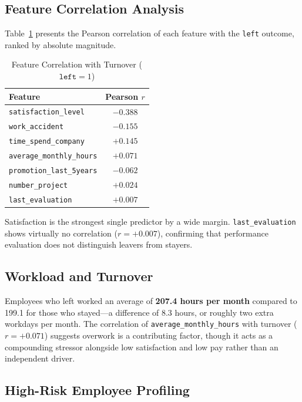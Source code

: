 \documentclass[conference]{IEEEtran}
\begin{document}
\subsection{Feature Correlation Analysis}

Table~\ref{tab:corr} presents the Pearson correlation of each feature with
the \texttt{left} outcome, ranked by absolute magnitude.

\begin{table}[h]
\caption{Feature Correlation with Turnover ($\mathtt{left} = 1$)}
\label{tab:corr}
\centering
\begin{tabular}{lc}
\toprule
\textbf{Feature} & \textbf{Pearson $r$} \\
\midrule
\texttt{satisfaction\_level}    & $-0.388$ \\
\texttt{work\_accident}         & $-0.155$ \\
\texttt{time\_spend\_company}   & $+0.145$ \\
\texttt{average\_monthly\_hours}& $+0.071$ \\
\texttt{promotion\_last\_5years}& $-0.062$ \\
\texttt{number\_project}        & $+0.024$ \\
\texttt{last\_evaluation}       & $+0.007$ \\
\bottomrule
\end{tabular}
\end{table}

Satisfaction is the strongest single predictor by a wide margin.
\texttt{last\_evaluation} shows virtually no correlation ($r = +0.007$),
confirming that performance evaluation does not distinguish leavers from
stayers.

\subsection{Workload and Turnover}

Employees who left worked an average of \textbf{207.4 hours per month}
compared to 199.1 for those who stayed---a difference of 8.3 hours, or
roughly two extra workdays per month. The correlation of
\texttt{average\_monthly\_hours} with turnover ($r = +0.071$) suggests
overwork is a contributing factor, though it acts as a compounding stressor
alongside low satisfaction and low pay rather than an independent driver.

\subsection{High-Risk Employee Profiling}
\end{document}
